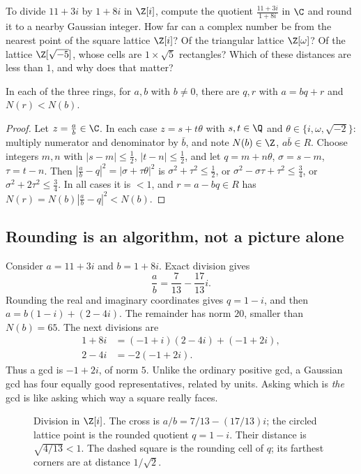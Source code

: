\begin{think}
To divide $11+3i$ by $1+8i$ in $\Z[i]$, compute the quotient $\frac{11+3i}{1+8i}$ in $\C$ and round it to a nearby Gaussian integer. How far can a complex number be from the nearest point of the square lattice $\Z[i]$? Of the triangular lattice $\Z[\omega]$? Of the lattice $\Z[\sqrt{-5}]$, whose cells are $1\times\sqrt5$ rectangles? Which of these distances are less than $1$, and why does that matter?
\end{think}

\begin{proposition}\label{prop:eucl}
In each of the three rings, for $a,b$ with $b\ne0$, there are $q,r$ with $a=bq+r$ and $N(r)<N(b)$.
\end{proposition}
\begin{proof}
Let $z=\frac ab\in\C$. In each case $z=s+t\theta$ with $s,t\in\Q$ and $\theta\in\{i,\omega,\sqrt{-2}\}$: multiply numerator and denominator by $\bar b$, and note $N(b)\in\Z$, $a\bar b\in R$. Choose integers $m,n$ with $|s-m|\le\frac12$, $|t-n|\le\frac12$, and let $q=m+n\theta$, $\sigma=s-m$, $\tau=t-n$. Then $\left|\frac ab-q\right|^2=|\sigma+\tau\theta|^2$ is $\sigma^2+\tau^2\le\frac12$, or $\sigma^2-\sigma\tau+\tau^2\le\frac34$, or $\sigma^2+2\tau^2\le\frac34$. In all cases it is $<1$, and $r=a-bq\in R$ has $N(r)=N(b)\left|\frac ab-q\right|^2<N(b)$.
\end{proof}

\subsection*{Rounding is an algorithm, not a picture alone}
Consider $a=11+3i$ and $b=1+8i$. Exact division gives
\[
\frac ab=\frac7{13}-\frac{17}{13}i.
\]
Rounding the real and imaginary coordinates gives $q=1-i$, and then
$a=b(1-i)+(2-4i)$. The remainder has norm $20$, smaller than $N(b)=65$.
The next divisions are
\[
\begin{aligned}
1+8i&=(-1+i)(2-4i)+(-1+2i),\\
2-4i&=-2(-1+2i).
\end{aligned}
\]
Thus a gcd is $-1+2i$, of norm $5$. Unlike the ordinary positive gcd, a Gaussian
gcd has four equally good representatives, related by units. Asking which is
\emph{the} gcd is like asking which way a square really faces.

\begin{figure}[ht]
\centering{}
\caption{Division in $\Z[i]$. The cross is $a/b=7/13-(17/13)i$;
the circled lattice point is the rounded quotient $q=1-i$. Their distance is
$\sqrt{4/13}<1$. The dashed square is the rounding cell of $q$; its farthest
corners are at distance $1/\sqrt2$.}
\label{fig:gaussian-rounding}
\end{figure}

